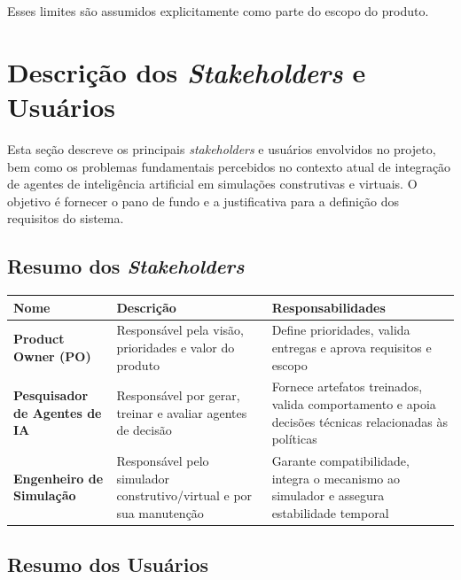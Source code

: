Esses limites são assumidos explicitamente como parte do escopo do produto.


\section{Descrição dos \emph{Stakeholders} e Usuários}

Esta seção descreve os principais \emph{stakeholders} e usuários envolvidos no projeto, bem como os problemas fundamentais percebidos no contexto atual de integração de agentes de inteligência artificial em simulações construtivas e virtuais. O objetivo é fornecer o pano de fundo e a justificativa para a definição dos requisitos do sistema.

\subsection{Resumo dos \emph{Stakeholders}}

\begin{table}[h]
    \begin{tabular}{| p{} | p{} | p{} |}
        \hline Nome & Descrição & Responsabilidades \\ \hline
        
        \textbf{Product Owner (PO)} &
        Responsável pela visão, prioridades e valor do produto &
        Define prioridades, valida entregas e aprova requisitos e escopo \\ \hline
        
        \textbf{Pesquisador de Agentes de IA} &
        Responsável por gerar, treinar e avaliar agentes de decisão &
        Fornece artefatos treinados, valida comportamento e apoia decisões técnicas relacionadas às políticas \\ \hline
        
        \textbf{Engenheiro de Simulação} &
        Responsável pelo simulador construtivo/virtual e por sua manutenção &
        Garante compatibilidade, integra o mecanismo ao simulador e assegura estabilidade temporal \\ \hline

    \end{tabular}
\end{table}

\newpage

\subsection{Resumo dos Usuários}

